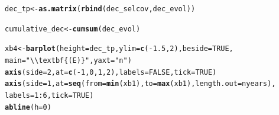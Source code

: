 \documentclass{article}\usepackage[]{graphicx}\usepackage[]{color}
\makeatletter
\newcommand{\hlnum}[1]{\textcolor[rgb]{0.686,0.059,0.569}{#1}}%
\newcommand{\hlstr}[1]{\textcolor[rgb]{0.192,0.494,0.8}{#1}}%
\newcommand{\hlopt}[1]{\textcolor[rgb]{0,0,0}{#1}}%
\newcommand{\hlstd}[1]{\textcolor[rgb]{0.345,0.345,0.345}{#1}}%
\newcommand{\hlkwb}[1]{\textcolor[rgb]{0.69,0.353,0.396}{#1}}%
\newcommand{\hlkwc}[1]{\textcolor[rgb]{0.333,0.667,0.333}{#1}}%
\newcommand{\hlkwd}[1]{\textcolor[rgb]{0.737,0.353,0.396}{\textbf{#1}}}%
\newenvironment{kframe}{%
 \def\at@end@of@kframe{}%
 \ifinner\ifhmode%
  \def\at@end@of@kframe{\end{minipage}}%
  \begin{minipage}{\columnwidth}%
 \fi\fi%
 \def\FrameCommand##1{\hskip\@totalleftmargin \hskip-\fboxsep
 \colorbox{shadecolor}{##1}\hskip-\fboxsep
     \hskip-\linewidth \hskip-\@totalleftmargin \hskip\columnwidth}%
 \MakeFramed {\advance\hsize-\width
   \@totalleftmargin\z@ \linewidth\hsize
   \@setminipage}}%
 {\par\unskip\endMakeFramed%
 \at@end@of@kframe}
\newenvironment{knitrout}{}{} %
\makeatother
\begin{document}
\begin{knitrout}
\begin{kframe}
\begin{alltt}
\hlstd{dec_tp} \hlkwb{<-} \hlkwd{as.matrix}\hlstd{(}\hlkwd{rbind}\hlstd{(dec_selcov, dec_evol))}

\hlstd{cumulative_dec} \hlkwb{<-} \hlkwd{cumsum}\hlstd{(dec_evol)}

\hlstd{xb4} \hlkwb{<-} \hlkwd{barplot}\hlstd{(}\hlkwc{height} \hlstd{= dec_tp,} \hlkwc{ylim} \hlstd{=} \hlkwd{c}\hlstd{(}\hlopt{-}\hlnum{1.5}\hlstd{,}\hlnum{2}\hlstd{),} \hlkwc{beside} \hlstd{=} \hlnum{TRUE}\hlstd{,}
               \hlkwc{main}\hlstd{=}\hlstr{"\textbackslash{}\textbackslash{}textbf\{(E)\}"}\hlstd{,} \hlkwc{yaxt}\hlstd{=}\hlstr{"n"}\hlstd{)}
\hlkwd{axis}\hlstd{(}\hlkwc{side}\hlstd{=}\hlnum{2}\hlstd{,} \hlkwc{at} \hlstd{=} \hlkwd{c}\hlstd{(}\hlopt{-}\hlnum{1}\hlstd{,}\hlnum{0}\hlstd{,}\hlnum{1}\hlstd{,}\hlnum{2}\hlstd{),} \hlkwc{labels} \hlstd{=} \hlnum{FALSE}\hlstd{,} \hlkwc{tick} \hlstd{=} \hlnum{TRUE}\hlstd{)}
\hlkwd{axis}\hlstd{(}\hlkwc{side}\hlstd{=}\hlnum{1}\hlstd{,} \hlkwc{at} \hlstd{=} \hlkwd{seq}\hlstd{(}\hlkwc{from}\hlstd{=}\hlkwd{min}\hlstd{(xb1),} \hlkwc{to}\hlstd{=}\hlkwd{max}\hlstd{(xb1),} \hlkwc{length.out} \hlstd{= nyears),}
     \hlkwc{labels} \hlstd{=} \hlnum{1}\hlopt{:}\hlnum{6}\hlstd{,}\hlkwc{tick} \hlstd{=} \hlnum{TRUE}\hlstd{)}
\hlkwd{abline}\hlstd{(}\hlkwc{h}\hlstd{=}\hlnum{0}\hlstd{)}


\end{alltt}
\end{kframe}
\end{knitrout}
\end{document}

